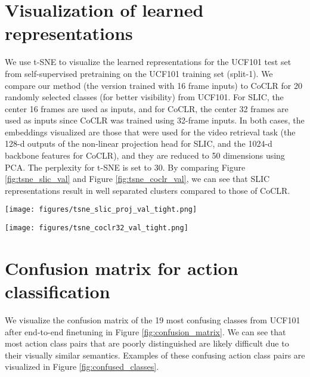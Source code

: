 \documentclass[10pt,twocolumn,letterpaper]{article}
\begin{document}
\section{Visualization of learned representations}
\label{tsne_visualization}
We use t-SNE to visualize the learned representations for the UCF101 test set from self-supervised pretraining on the UCF101 training set (split-1). We compare our method (the version trained with 16 frame inputs) to CoCLR\cite{coclr} for 20 randomly selected classes (for better visibility) from UCF101. For SLIC, the center 16 frames are used as inputs, and for CoCLR, the center 32 frames are used as inputs since CoCLR was trained using 32-frame inputs. In both cases, the embeddings visualized are those that were used for the video retrieval task (the 128-d outputs of the non-linear projection head for SLIC, and the 1024-d backbone features for CoCLR), and they are reduced to 50 dimensions using PCA. The perplexity for t-SNE is set to 30. By comparing Figure \ref{fig:tsne_slic_val} and Figure \ref{fig:tsne_coclr_val}, we can see that SLIC representations result in well separated clusters compared to those of CoCLR.

\begin{figure*}[ht]
  \centering
  \texttt{[image: figures/tsne\_slic\_proj\_val\_tight.png]}
\caption{t-SNE visualization of SLIC embeddings for 20 randomly chosen action classes from the UCF101 test set (split-1).}
  \label{fig:tsne_slic_val}
\end{figure*}

\begin{figure*}[ht]
  \centering
  \texttt{[image: figures/tsne\_coclr32\_val\_tight.png]}
\caption{t-SNE visualization of CoCLR embeddings for 20 randomly chosen action classes from the UCF101 test set (split-1).}
  \label{fig:tsne_coclr_val}
\end{figure*}


\section{Confusion matrix for action classification}
\label{confusion_matrix_classification}

We visualize the confusion matrix of the 19 most confusing classes from UCF101 after end-to-end finetuning in Figure \ref{fig:confusion_matrix}. We can see that most action class pairs that are poorly distinguished are likely difficult due to their visually similar semantics. Examples of these confusing action class pairs are visualized in Figure \ref{fig:confused_classes}. 
\end{document}
